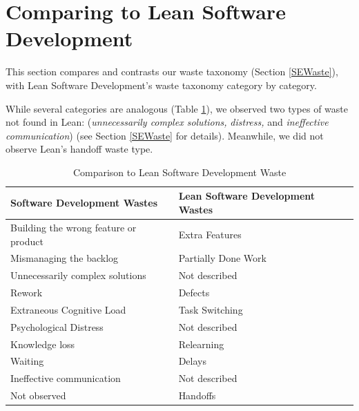 





\section{Comparing to Lean Software Development}
\label{LeanSoftwareDevelopmentComparison}

This section compares and contrasts our waste taxonomy (Section \ref{SEWaste}), with Lean Software Development's waste taxonomy \cite{PoppendieckConceptToCash} category by category. 

While several categories are analogous (Table \ref{LeanSoftwareDevelopmentComparisonTable}), we observed two types of waste not found in Lean: (\textit{unnecessarily complex solutions,} \textit{distress,} and \textit{ineffective communication}) (see Section \ref{SEWaste} for details). Meanwhile, we did not observe Lean's handoff waste type.

\begin{table}[t]
\renewcommand{\arraystretch}{1.5}
\centering
\caption{Comparison to Lean Software Development Waste}
\label{LeanSoftwareDevelopmentComparisonTable}
\begin{tabular}{|p{1.57in}|p{1.57in}|}
\hline
Software Development Wastes           & Lean Software Development Wastes \\ \hline
Building the wrong feature or product & Extra Features                            \\ \hline
Mismanaging the backlog               & Partially Done Work                            \\ \hline
Unnecessarily complex solutions                & Not described                             \\ \hline
Rework                                & Defects                                   \\ \hline
Extraneous Cognitive Load                 & Task Switching  \\ \hline
Psychological Distress                             & Not described \\ \hline
Knowledge loss                 & Relearning                            \\ \hline
Waiting                               & Delays                                    \\ \hline
Ineffective communication             & Not described                             \\ \hline
Not observed                          & Handoffs                                  \\ \hline
\end{tabular}
\end{table}


